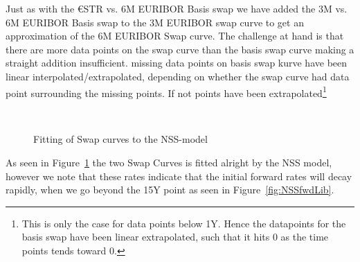 \documentclass[12pt]{article}
\begin{document}
Just as with the €STR vs. 6M EURIBOR Basis swap
we have added the 3M vs. 6M EURIBOR Basis swap
to the 3M EURIBOR swap curve to get an
approximation of the 6M EURIBOR Swap curve.
The challenge at hand is that there are
more data points on the
swap curve than the basis swap curve
making a straight addition insufficient.
missing data points on basis swap kurve
have been linear interpolated/extrapolated,
depending on whether the swap curve had data point
surrounding the missing points.
If not points have been extrapolated\footnote{This
is only the case for data points below 1Y.
Hence the datapoints for the basis swap have been linear extrapolated, such
that it hits 0 as the time points tends toward 0.}
\begin{figure}[H]
\\
\caption{Fitting of Swap curves to the NSS-model}
\label{fig:NSSfit}
\end{figure}
As seen in Figure~\ref{fig:NSSfit}
the two Swap Curves is fitted alright by the NSS model,
however we note that these rates
indicate that the initial forward rates
will decay rapidly, when
we go beyond the 15Y point as seen in Figure~\ref{fig:NSSfwdLib}.
\end{document}
